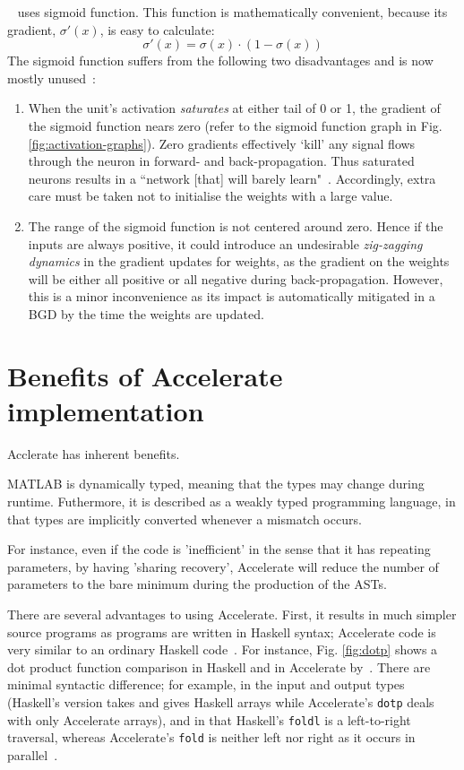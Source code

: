 ~\cite{Eve16} uses sigmoid function. This function is mathematically convenient, because its gradient, $\sigma'(x)$, is easy to calculate:
$$\sigma'(x) = \sigma(x) \cdot (1 - \sigma(x))$$
The sigmoid function suffers from the following two disadvantages and is now mostly unused~\cite{Kar16}:
\begin{enumerate}
\item When the unit's activation \textit{saturates} at either tail of 0 or 1, the gradient of the sigmoid function nears zero (refer to the sigmoid function graph in Fig. \ref{fig:activation-graphs}). Zero gradients effectively `kill' any signal flows through the neuron in forward- and back-propagation. Thus saturated neurons results in a ``network [that] will barely learn"~\cite{Kar16}. Accordingly, extra care must be taken not to initialise the weights with a large value.
\item The range of the sigmoid function is not centered around zero. Hence if the inputs are always positive, it could introduce an undesirable \textit{zig-zagging dynamics} in the gradient updates for weights, as the gradient on the weights will be either all positive or all negative during back-propagation. However, this is a minor inconvenience as its impact is automatically mitigated in a BGD by the time the weights are updated.
\end{enumerate}



\section{Benefits of Accelerate implementation} \label{se:impl.benefits}

Acclerate has inherent benefits.

MATLAB is dynamically typed, meaning that the types may change during runtime. Futhermore, it is described as a weakly typed programming language, in that types are implicitly converted whenever a mismatch occurs.

For instance, even if the code is 'inefficient' in the sense that it has repeating parameters, by having 'sharing recovery', Accelerate will reduce the number of parameters to the bare minimum during the production of the ASTs.

There are several advantages to using Accelerate. First, it results in much simpler source programs as programs are written in Haskell syntax; Accelerate code is very similar to an ordinary Haskell code~\cite{Mar13}. For instance, Fig. \ref{fig:dotp} shows a dot product function comparison in Haskell and in Accelerate by~\cite{McD13}. There are minimal syntactic difference; for example, in the input and output types (Haskell's version takes and gives Haskell arrays while Accelerate's \texttt{dotp} deals with only Accelerate arrays), and in that Haskell's \texttt{foldl} is a left-to-right traversal, whereas Accelerate's \texttt{fold} is neither left nor right as it occurs in parallel~\cite{McD13}.

